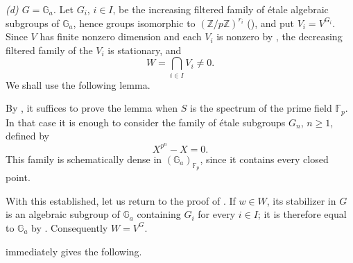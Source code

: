 \textit{(d) \(G=\mathbb G_a\).}
Let \(G_i\), \(i\in I\), be the increasing filtered family of étale
algebraic subgroups of \(\mathbb G_a\), hence groups isomorphic to
\((\mathbb Z/p\mathbb Z)^{r_i}\) (), and put
\(V_i=V^{G_i}\).  Since \(V\) has finite nonzero dimension and each
\(V_i\) is nonzero by , the decreasing filtered family of the
\(V_i\) is stationary, and
\[
  W=\bigcap_{i\in I}V_i\ne0.
\]
We shall use the following lemma.


By , it suffices to prove the lemma when \(S\) is the
spectrum of the prime field \(\mathbb F_p\).  In that case it is
enough to consider the family of étale subgroups \(G_n\), \(n\geq1\),
defined by
\[
  X^{p^n}-X=0.
\]
This family is schematically dense in
\((\mathbb G_a)_{\mathbb F_p}\), since it contains every closed point.

With this established, let us return to the proof of .  If
\(w\in W\), its stabilizer in \(G\) is an algebraic subgroup of
\(\mathbb G_a\) containing \(G_i\) for every \(i\in I\); it is
therefore equal to \(\mathbb G_a\) by .  Consequently
\(W=V^G\).

 immediately gives the following.
